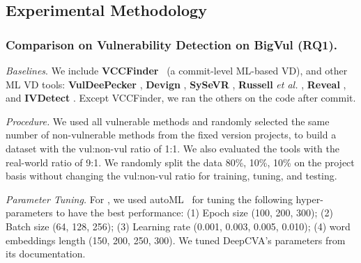 \subsection{Experimental Methodology}
\label{method:sec}

%





\subsubsection{Comparison on Vulnerability Detection on BigVul (RQ1).~\\}

\emph{Baselines}. We include {\bf VCCFinder}~\cite{perl2015vccfinder}
(a commit-level ML-based VD), and other ML VD tools:
\textbf{VulDeePecker} \cite{li2018vuldeepecker}, \textbf{Devign}
\cite{zhou2019devign}, \textbf{SySeVR} \cite{li2021sysevr},
\textbf{Russell} {\em et al.}  \cite{russell2018automated},
\textbf{Reveal} \cite{chakraborty2021deep}, and {\bf IVDetect}
\cite{li2021vulnerability}. Except VCCFinder, we ran the others
on the code after commit. 

\emph{Procedure.}  We used all vulnerable methods and randomly selected
the same number of non-vulnerable methods from the fixed version
projects, to build a dataset with the vul:non-vul ratio of 1:1. We
also evaluated the tools with the real-world ratio of 9:1. We randomly split the
data 80\%, 10\%, 10\% on the project basis without changing the
vul:non-vul ratio for training, tuning, and testing.

\emph{Parameter Tuning.}  For {\tool}, we used
autoML~\cite{NNI} for tuning the following hyper-parameters to have the
best performance: (1) Epoch size (100, 200, 300); (2) Batch size (64,
128, 256); (3) Learning rate (0.001, 0.003, 0.005, 0.010); (4) word embeddings length (150, 200, 250, 300). We
tuned DeepCVA's parameters from its documentation.

